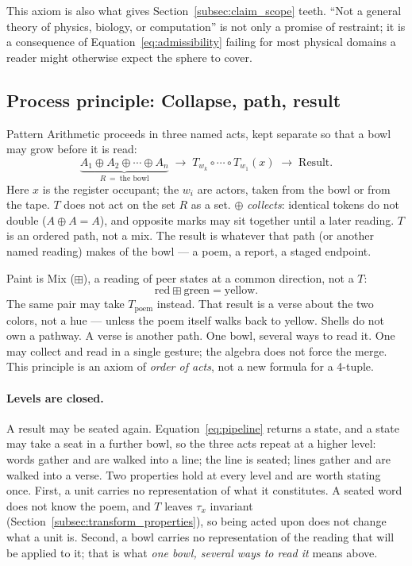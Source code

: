 \documentclass[12pt, a4paper]{article}
\begin{document}
This axiom is also what gives
Section~\ref{subsec:claim_scope} teeth. ``Not a general theory of
physics, biology, or computation'' is not only a promise of
restraint; it is a consequence of Equation~\eqref{eq:admissibility}
failing for most physical domains a reader might otherwise expect
the sphere to cover.

\subsection{Process principle: Collapse, path, result}
\label{subsec:process_principle}
Pattern Arithmetic proceeds in three named acts, kept separate so that a bowl may grow before it is read:
\begin{equation}
    \underbrace{A_1 \oplus A_2 \oplus \cdots \oplus A_n}_{R\ =\ \text{the bowl}}
    \;\longrightarrow\;
    T_{w_k}\circ \cdots \circ T_{w_1}(x)
    \;\longrightarrow\;
    \text{Result}.
    \label{eq:pipeline}
\end{equation}
Here $x$ is the register occupant; the $w_i$ are actors, taken from
the bowl or from the tape. $T$ does not act on the set $R$ as a set.
$\oplus$ \emph{collects}: identical tokens do not double ($A \oplus A = A$), and opposite marks may sit together until a later reading. $T$ is an ordered path, not a mix. The result is whatever that path (or another named reading) makes of the bowl --- a poem, a report, a staged endpoint.

Paint is Mix ($\boxplus$), a reading of peer states at a common direction, not a $T$:
\[
\mathrm{red}\boxplus\mathrm{green} = \mathrm{yellow}.
\]
The same pair may take $T_{\mathrm{poem}}$ instead. That result is a
verse about the two colors, not a hue --- unless the poem itself
walks back to yellow. Shells do not own a pathway. A verse is another
path. One bowl, several ways to read it. One may collect
and read in a single gesture; the algebra does not force the merge.
This principle is an axiom of \emph{order of acts}, not a new formula
for a 4-tuple.

\paragraph{Levels are closed.}
A result may be seated again. Equation~\eqref{eq:pipeline} returns a
state, and a state may take a seat in a further bowl, so the three
acts repeat at a higher level: words gather and are walked into a
line; the line is seated; lines gather and are walked into a verse.
Two properties hold at every level and are worth stating once. First,
a unit carries no representation of what it constitutes. A seated word
does not know the poem, and $T$ leaves $\tau_x$ invariant
(Section~\ref{subsec:transform_properties}), so being acted upon does
not change what a unit is. Second, a bowl carries no representation of
the reading that will be applied to it; that is what \emph{one bowl,
several ways to read it} means above.
\end{document}
